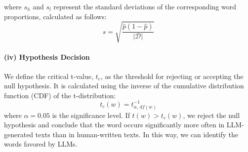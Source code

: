 where $s_h$ and $s_l$ represent the standard deviations of the corresponding word proportions, calculated as follows:
\begin{equation}
    s=\sqrt{\frac{\hat{p}(1-\hat{p})}{\left| \mathcal{D} \right|}}
\end{equation}






\paragraph{(iv) Hypothesis Decision}
We define the critical t-value, $t_c$, as the threshold for rejecting or accepting the null hypothesis. 
It is calculated using the inverse of the cumulative distribution function (CDF) of the t-distribution:
\begin{equation}
    t_c(w) = t_{\alpha, \, df(w)}^{-1}
\end{equation}
where $\alpha=0.05$ is the significance level.
If $t(w) > t_c(w)$, we reject the null hypothesis and conclude that the word occurs significantly more often in LLM-generated texts than in human-written texts. In this way, we can identify the words favored by LLMs.


